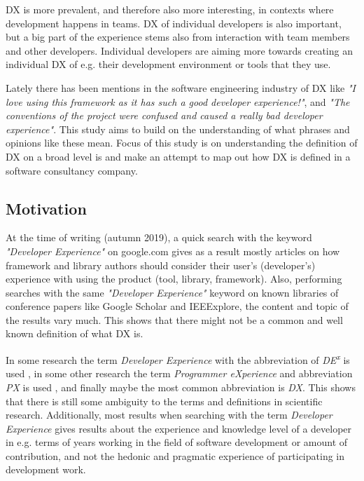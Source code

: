 \documentclass[english, 12pt, a4paper, sci, utf8, a-1b, online]{aaltothesis}
\newcommand{\now}{autumn 2019}
\begin{document}
DX is more prevalent, and therefore also more interesting, in contexts where development happens in teams. DX of individual developers is also important, but a big part of the experience stems also from interaction with team members and other developers. Individual developers are aiming more towards creating an individual DX of e.g. their development environment or tools that they use.

Lately there has been mentions in the software engineering industry of DX like \textit{"I love using this framework as it has such a good developer experience!"}, and \textit{"The conventions of the project were confused and caused a really bad developer experience"}. This study aims to build on the understanding of what phrases and opinions like these mean. Focus of this study is on understanding the definition of DX on a broad level is and make an attempt to map out how DX is defined in a software consultancy company.

\thispagestyle{empty}

\subsection{Motivation} \label{motivation}

At the time of writing (\now), a quick search with the keyword \textit{"Developer Experience"} on google.com gives as a result mostly articles on how framework and library authors should consider their user's (developer's) experience with using the product (tool, library, framework). Also, performing searches with the same \textit{"Developer Experience"} keyword on known libraries of conference papers like Google Scholar and IEEExplore, the content and topic of the results vary much. This shows that there might not be a common and well known definition of what DX is.

In some research the term \textit{Developer Experience} with the abbreviation of \textit{DE\textsuperscript{x}} is used \citep{fagerholm-dx-concept-and-definition}, in some other research the term \textit{Programmer eXperience} and abbreviation \textit{PX} is used \citep{programmer-experience}, and finally maybe the most common abbreviation is \textit{DX}. This shows that there is still some ambiguity to the terms and definitions in scientific research. Additionally, most results when searching with the term \textit{Developer Experience} gives results about the experience and knowledge level of a developer in e.g. terms of years working in the field of software development or amount of contribution, and not the hedonic and pragmatic experience of participating in development work.
\end{document}
